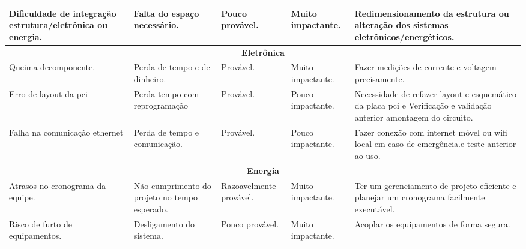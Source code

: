 \begin{longtable}{|m{2cm}|m{3cm}|m{2.8cm}|m{3cm}|m{4cm}|}
Dificuldade de integração estrutura/eletrônica ou energia. & Falta do espaço necessário.                                                                          & Pouco provável.         & Muito impactante.         & Redimensionamento da estrutura ou alteração dos sistemas eletrônicos/energéticos.                                 \\ \hline
\multicolumn{5}{|c|}{\textbf{Eletrônica}}\tabularnewline
\hline
Queima decomponente. & Perda de tempo e de dinheiro.        & Provável.         & Muito impactante.         & Fazer medições de corrente e voltagem precisamente.                                 \\ \hline
Erro de layout da pci & Perda tempo com reprogramação        & Provável.         & Pouco impactante.         & Necessidade de refazer layout e esquemático da placa pci e Verificação e validação anterior amontagem do circuito.                                 \\ \hline
Falha na comunicação ethernet & Perda de tempo e comunicação.        & Provável.         & Pouco impactante.         & Fazer conexão com internet móvel ou wifi local em caso de emergência.e teste anterior ao uso.                                 \\ \hline
\multicolumn{5}{|c|}{\textbf{Energia}}\tabularnewline
\hline
Atrasos no cronograma da equipe.                                        & Não cumprimento do projeto no tempo esperado.                      & Razoavelmente provável. & Muito impactante.         & Ter um gerenciamento de projeto eficiente e planejar um cronograma facilmente executável.                                                                                                                                      \\ \hline
Risco de furto de equipamentos.                                  & Desligamento do sistema.             & Pouco provável.         & Muito impactante. & Acoplar os equipamentos de forma segura. \\ \hline


\end{longtable}
